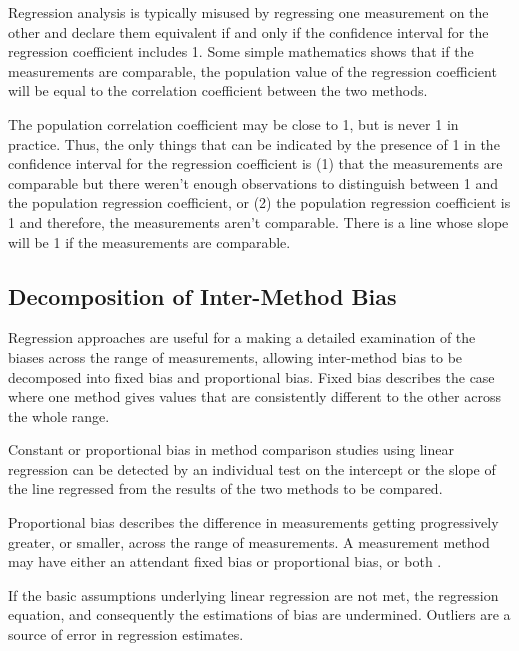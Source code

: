 \documentclass[12pt, a4paper]{report}
\theoremstyle{plain}
\theoremstyle{definition}
\theoremstyle{remark}
\begin{document}
	 Regression analysis is typically misused by regressing one measurement on the other and declare them equivalent if and only if the confidence interval for the regression coefficient includes 1. Some simple mathematics shows that if the measurements are comparable, the population value of the regression coefficient will be equal to the correlation coefficient between the two methods. 
 
The population correlation coefficient may be close to 1, but is never 1 in practice. Thus, the only things that can be indicated by the presence of 1 in the confidence interval for the regression coefficient is (1) that the measurements are comparable but there weren't enough observations to distinguish between 1 and the population regression coefficient, or (2) the population regression coefficient is 1 and therefore, the measurements aren't comparable. There is a line whose slope will be 1 if the measurements are comparable. 
	
\subsection{Decomposition of Inter-Method Bias}
Regression approaches are useful for a making a detailed examination of the biases across the range of measurements, allowing inter-method bias to be decomposed into fixed bias and proportional bias. Fixed bias describes the case where one method gives values that are consistently different to the other across the whole range. 


Constant or proportional bias in method comparison studies using linear regression can be detected by an individual test on the intercept or the slope of the line regressed from the results of the two methods to be compared.


Proportional bias describes the difference in measurements getting progressively greater, or smaller, across the range of measurements. A measurement method may have either an attendant fixed bias or proportional bias, or both \citep{ludbrook02}.

If the basic assumptions underlying linear regression are not met, the regression equation, and consequently the estimations of bias are undermined. Outliers are a source of error in regression estimates.
\end{document}
